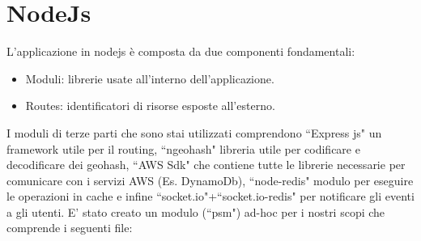 \section{NodeJs}
L'applicazione in nodejs è composta da due componenti fondamentali:
\begin{itemize}
	\item Moduli: librerie usate all'interno dell'applicazione.
	\item Routes: identificatori di risorse esposte all'esterno.
\end{itemize}
I moduli di terze parti che sono stai utilizzati comprendono ``Express js" un framework utile per il routing, ``ngeohash" libreria utile per codificare e decodificare dei geohash, ``AWS Sdk" che contiene tutte le librerie necessarie per comunicare con i servizi AWS (Es. DynamoDb), ``node-redis" modulo per eseguire le operazioni in cache e infine ``socket.io"+``socket.io-redis" per notificare gli eventi a gli utenti.
E' stato creato un modulo (``psm") ad-hoc per i nostri scopi che comprende i seguenti file:
